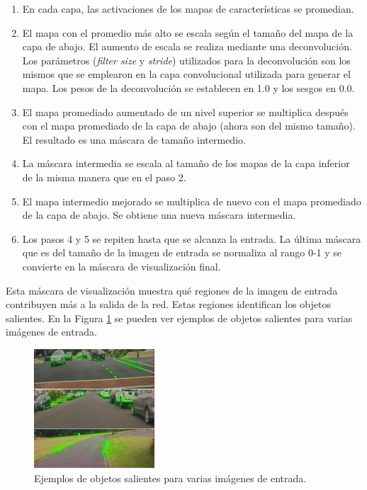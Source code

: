 \begin{enumerate}
    \item En cada capa, las activaciones de los mapas de características se promedian.
    \item El mapa con el promedio más alto se escala según el tamaño del mapa de la capa de abajo. El aumento de escala se realiza mediante una deconvolución. Los parámetros (\textit{filter size} y \textit{stride}) utilizados para la deconvolución son los mismos que se emplearon en la capa convolucional utilizada para generar el mapa. Los pesos de la deconvolución se establecen en 1.0 y los sesgos en 0.0.
    \item El mapa promediado aumentado de un nivel superior se multiplica después con el mapa promediado de la capa de abajo (ahora son del mismo tamaño). El resultado es una máscara de tamaño intermedio.
    \item La máscara intermedia se escala al tamaño de los mapas de la capa inferior de la misma manera que en el paso 2.
    \item El mapa intermedio mejorado se multiplica de nuevo con el mapa promediado de la capa de abajo. Se obtiene una nueva máscara intermedia.
    \item Los pasos 4 y 5 se repiten hasta que se alcanza la entrada. La última máscara que es del tamaño de la imagen de entrada se normaliza al rango 0-1 y se convierte en la máscara de visualización final.
\end{enumerate}

Esta máscara de visualización muestra qué regiones de la imagen de entrada contribuyen más a la salida de la red. Estas regiones identifican los objetos salientes. En la Figura \ref{fig.salient} se pueden ver ejemplos de objetos salientes para varias imágenes de entrada.\\

\begin{figure}
\begin{center}
	\includegraphics[width=0.4\textwidth]{figures/Estado_arte/saliencia.png}
   \caption{Ejemplos de objetos salientes para varias imágenes de entrada.}
	\label{fig.salient}
\end{center}
\end{figure}

